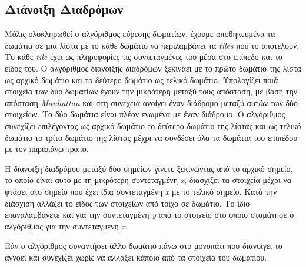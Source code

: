 \subsection{Διάνοιξη Διαδρόμων}
\par
Μόλις ολοκληρωθεί ο αλγόριθμος εύρεσης δωματίων, έχουμε αποθηκευμένα τα δωμάτια σε μια λίστα με το κάθε δωμάτιο να περιλαμβάνει τα \textit{tiles} που το αποτελούν. Το κάθε \textit{tile} έχει ως πληροφορίες τις συντεταγμένες του μέσα στο επίπεδο και το είδος του. Ο αλγόριθμος διάνοιξης διαδρόμων ξεκινάει με το πρώτο δωμάτιο της λίστα ως αρχικό δωμάτιο και το δεύτερο δωμάτιο ως τελικό δωμάτιο. Υπολογίζει ποιά στοιχεία των δύο δωματίων έχουν την μικρότερη μεταξύ τους απόσταση, με βάση την απόσταση \textit{Manhattan} και στη συνέχεια ανοίγει έναν διάδρομο μεταξύ αυτών των δύο στοιχείων. Τα δύο δωμάτια είναι πλέον ενωμένα με έναν διάδρομο. Ο αλγόριθμος συνεχίζει επιλέγοντας ως αρχικό δωμάτιο το δεύτερο δωμάτιο της λίστας και ως τελικό δωμάτιο το τρίτο δωμάτιο της λίστας μέχρι να συνδέσει όλα τα δωμάτια του επιπέδου με τον παραπάνω τρόπο.
\par
H διάνοιξη διαδρόμου μεταξύ δύο σημείων γίνετε ξεκινώντας από το αρχικό σημείο, το οποίο είναι αυτό με τη μικρότερη συντεταγμένη \textit{x}, διασχίζει τα στοιχεία μέχρι να φτάσει στο σημείο που έχει ίδια συντεταγμένη \textit{x} με το τελικό σημείο. Κατά την διάσχιση αλλάζει το είδος των στοιχείων από τοίχο σε δωμάτιο. Το ίδιο επαναλαμβάνετε και για την συντεταγμένη \textit{y} από το στοιχείο στο οποίο σταμάτησε ο αλγόριθμος για την συντεταγμένη \textit{x}.
\par
Εάν ο αλγόριθμος συναντήσει άλλο δωμάτιο πάνω στο μονοπάτι που διανοίγει το αγνοεί και συνεχίζει χωρίς να αλλάξει κάποιο από τα στοιχεία του δωματίου.

